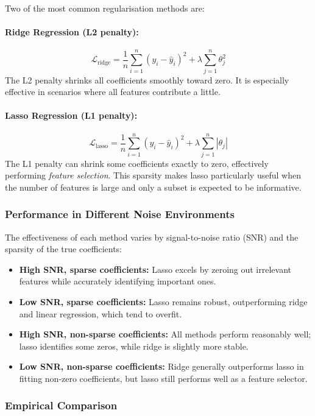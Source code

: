 \documentclass[9pt]{extarticle}
\begin{document}
Two of the most common regularisation methods are:

\paragraph{Ridge Regression (L2 penalty):}
\[
\mathcal{L}_{\text{ridge}} = \frac{1}{n} \sum_{i=1}^n (y_i - \hat{y}_i)^2 + \lambda \sum_{j=1}^n \theta_j^2
\]
The L2 penalty shrinks all coefficients smoothly toward zero. It is especially effective in scenarios where all features contribute a little.

\paragraph{Lasso Regression (L1 penalty):}
\[
\mathcal{L}_{\text{lasso}} = \frac{1}{n} \sum_{i=1}^n (y_i - \hat{y}_i)^2 + \lambda \sum_{j=1}^n |\theta_j|
\]
The L1 penalty can shrink some coefficients exactly to zero, effectively performing \emph{feature selection}. This sparsity makes lasso particularly useful when the number of features is large and only a subset is expected to be informative.

\subsubsection*{Performance in Different Noise Environments}

The effectiveness of each method varies by signal-to-noise ratio (SNR) and the sparsity of the true coefficients:

\begin{itemize}
    \item \textbf{High SNR, sparse coefficients:} Lasso excels by zeroing out irrelevant features while accurately identifying important ones.
    \item \textbf{Low SNR, sparse coefficients:} Lasso remains robust, outperforming ridge and linear regression, which tend to overfit.
    \item \textbf{High SNR, non-sparse coefficients:} All methods perform reasonably well; lasso identifies some zeros, while ridge is slightly more stable.
    \item \textbf{Low SNR, non-sparse coefficients:} Ridge generally outperforms lasso in fitting non-zero coefficients, but lasso still performs well as a feature selector.
\end{itemize}

\subsubsection*{Empirical Comparison}
\end{document}
